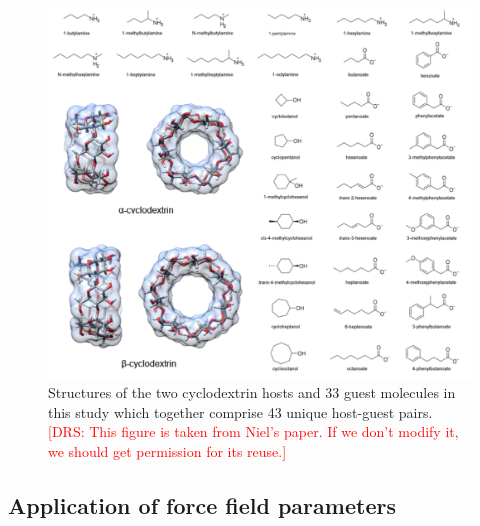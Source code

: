 \documentclass[9pt,lineno]{elife}
\newcommand{\drsnote}[1]{ {\textcolor{red} { [DRS: #1] }}}
\newcommand{\drsnote}[1]{}
\begin{document}
\begin{figure}[tb]
\centering
\includegraphics[width=\textwidth]{images/host-guest-pairs.png}
\caption{Structures of the two cyclodextrin hosts and 33 guest molecules in this study which together comprise 43 unique host-guest pairs. \drsnote{This figure is taken from Niel's paper. If we don't modify it, we should get permission for its reuse.}}
\label{fig:host-guest-pairs}
\end{figure}

\subsection{Application of force field parameters}
\end{document}

